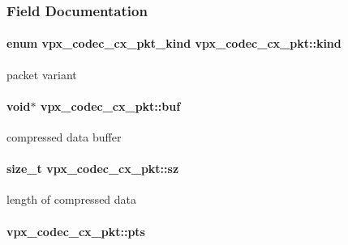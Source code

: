 \subsubsection{Field Documentation}
\hypertarget{structvpx__codec__cx__pkt_a41f395b39516343c1329a4a85a0084f2}{
\paragraph[{kind}]{\setlength{\rightskip}{0pt plus 5cm}enum {\bf vpx\+\_\+codec\+\_\+cx\+\_\+pkt\+\_\+kind} vpx\+\_\+codec\+\_\+cx\+\_\+pkt\+::kind}}\label{structvpx__codec__cx__pkt_a41f395b39516343c1329a4a85a0084f2}
packet variant \hypertarget{structvpx__codec__cx__pkt_a9e1db068593b6037e70b05b5239784d2}{
\paragraph[{buf}]{\setlength{\rightskip}{0pt plus 5cm}void$\ast$ vpx\+\_\+codec\+\_\+cx\+\_\+pkt\+::buf}}\label{structvpx__codec__cx__pkt_a9e1db068593b6037e70b05b5239784d2}
compressed data buffer \hypertarget{structvpx__codec__cx__pkt_a857321ba2dc65e81c430d14c36a542d9}{
\paragraph[{sz}]{\setlength{\rightskip}{0pt plus 5cm}size\+\_\+t vpx\+\_\+codec\+\_\+cx\+\_\+pkt\+::sz}}\label{structvpx__codec__cx__pkt_a857321ba2dc65e81c430d14c36a542d9}
length of compressed data \hypertarget{structvpx__codec__cx__pkt_aa75fe039fe6b47fb25d20684864bef12}{
\paragraph[{pts}]{ vpx\+\_\+codec\+\_\+cx\+\_\+pkt\+::pts}}\label{structvpx__codec__cx__pkt_aa75fe039fe6b47fb25d20684864bef12}
